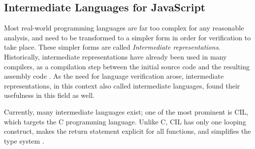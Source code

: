 \documentclass[a4paper,11pt,twoside]{report}
\begin{document}
\subsection{Intermediate Languages for JavaScript}\label{sec:ir}
Most real-world programming languages are far too complex for any reasonable analysis, and need to be transformed to a simpler form in order for verification to take place. These simpler forms are called {\em Intermediate representations}. Historically, intermediate representations have already been used in many compilers, as a compilation step between the initial source code and the resulting assembly code \cite{Necula2002}. As the need for language verification arose, intermediate representations, in this context also called intermediate languages, found their usefulness in this field as well.

Currently, many intermediate languages exist; one of the most prominent is CIL, which targets the C programming language. Unlike C, CIL has only one looping construct, makes the return statement explicit for all functions, and simplifies the type system \cite{Necula2002}.
\end{document}
